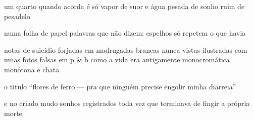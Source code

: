 \begin{poem}
\begin{stanza}
um quarto quando acorda\verseline
é só vapor de suor\verseline
e água pesada de sonho\verseline
ruim \quad de pesadelo
\end{stanza}
\begin{stanza}
numa folha de papel\verseline
palavras que não dizem:\verseline
\qquad espelhos\verseline
\qquad só repetem\verseline
\qquad o que havia
\end{stanza}
\begin{stanza}
notas de suicídio forjadas\verseline
em madrugadas brancas\verseline
\qquad nunca vistas\verseline
ilustradas com umas\verseline
fotos falsas em p \& b\verseline
\qquad como a vida era\verseline
\qquad antigamente\verseline
monocromática monótona e chata
\end{stanza}
\begin{stanza}
o titulo “flores de ferro ---\verseline
pra que ninguém precise\verseline
engolir minha diarreia”
\end{stanza}
\begin{stanza}
e no criado mudo\verseline
sonhos registrados\verseline
toda vez que terminava\verseline
de fingir a própria morte
\end{stanza}
\end{poem}